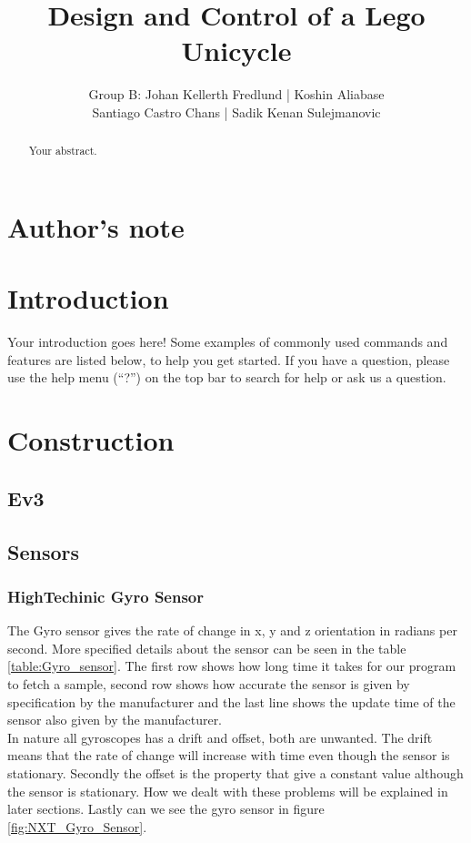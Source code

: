 \documentclass[a4paper]{article}
\title{Design and Control of a Lego Unicycle}
\author{Group B: Johan Kellerth Fredlund | Koshin Aliabase\\ Santiago Castro Chans | Sadik Kenan Sulejmanovic}
\begin{document}
\maketitle

\begin{abstract}
Your abstract.
\end{abstract}

\tableofcontents

\section{Author's note}

\section{Introduction}

Your introduction goes here! Some examples of commonly used commands and features are listed below, to help you get started. If you have a question, please use the help menu (``?'') on the top bar to search for help or ask us a question.

\section{Construction}

	\subsection{Ev3}
    \subsection{Sensors}
    	\subsubsection{HighTechinic Gyro Sensor}
        The Gyro sensor gives the rate of change in x, y and z orientation in radians per second. More specified details about the sensor can be seen in the table \ref{table:Gyro_sensor}. The first row shows how long time it takes for our program to fetch a sample, second row shows how accurate the sensor is given by specification by the manufacturer and the last line shows the update time of the sensor also given by the manufacturer. 
\\In nature all gyroscopes has a drift and offset, both are unwanted. The drift means that the rate of change will increase with time even though the sensor is stationary. Secondly the offset is the property that give a constant value although the sensor is stationary. How we dealt with these problems will be explained in later sections. Lastly can we see the gyro sensor in figure \ref{fig:NXT_Gyro_Sensor}.  
        
\end{document}
